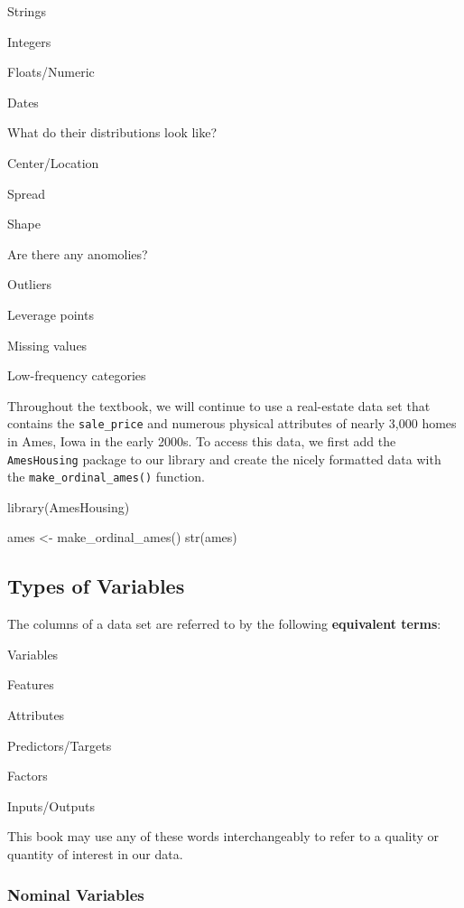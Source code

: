 \documentclass[
  letterpaper,
  DIV=11,
  numbers=noendperiod]{scrreprt}
\newenvironment{Shaded}{\begin{snugshade}}{\end{snugshade}}
\newcommand{\FunctionTok}[1]{\textcolor[rgb]{0.28,0.35,0.67}{#1}}
\newcommand{\NormalTok}[1]{\textcolor[rgb]{0.00,0.23,0.31}{#1}}
\newcommand{\OtherTok}[1]{\textcolor[rgb]{0.00,0.23,0.31}{#1}}
\begin{document}
Strings

Integers

Floats/Numeric

Dates

What do their distributions look like?

Center/Location

Spread

Shape

Are there any anomolies?

Outliers

Leverage points

Missing values

Low-frequency categories

Throughout the textbook, we will continue to use a real-estate data set
that contains the \texttt{sale\_price} and numerous physical attributes
of nearly 3,000 homes in Ames, Iowa in the early 2000s. To access this
data, we first add the \texttt{AmesHousing} package to our library and
create the nicely formatted data with the \texttt{make\_ordinal\_ames()}
function.

\begin{Shaded}
\begin{Highlighting}[]
\FunctionTok{library}\NormalTok{(AmesHousing)}

\NormalTok{ames }\OtherTok{\textless{}{-}} \FunctionTok{make\_ordinal\_ames}\NormalTok{() }
\FunctionTok{str}\NormalTok{(ames)}
\end{Highlighting}
\end{Shaded}

\hypertarget{vartypes}{%
\subsection{Types of Variables}\label{vartypes}}

The columns of a data set are referred to by the following
\textbf{equivalent terms}:

Variables

Features

Attributes

Predictors/Targets

Factors

Inputs/Outputs

This book may use any of these words interchangeably to refer to a
quality or quantity of interest in our data.

\hypertarget{nominal-variables}{%
\subsubsection*{Nominal Variables}\label{nominal-variables}}
\end{document}
